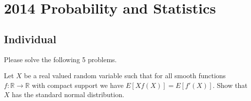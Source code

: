 \section{2014 Probability and Statistics}

\subsection{Individual}
Please solve the following 5 problems.

\begin{exercise}\label{probability:2014:1}
Let $X$ be a real valued random variable such that for all smooth functions $f: \mathbb{R} \to \mathbb{R}$ with compact support we have $E[Xf(X)] = E[f'(X)]$. Show that $X$ has the standard normal distribution.
\end{exercise}

